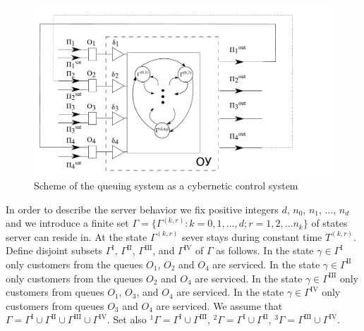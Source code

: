 \documentclass[10pt]{article}
\begin{document}
\begin{figure}[h!]
   \centering
    \includegraphics[width=\textwidth]{SystemScheme.pdf} %
    \caption {Scheme of the queuing system as a cybernetic control system}
    \label{SystemScheme}
\end{figure}

In order to describe the server behavior we fix positive integers $d$, $n_0$, $n_1$, $\ldots$,
$n_d$ and we introduce a finite set $\Gamma=\{\Gamma^{(k,r)} \colon k=0,1,\ldots,d; r=1,2,\ldots
n_k\}$ of states server can reside in. At the state $\Gamma^{(k,r)}$ sever stays during constant
time $T^{(k,r)}$. Define disjoint subsets $\Gamma^{\mathrm{I}}$, $\Gamma^{\mathrm{II}}$,
$\Gamma^{\mathrm{III}}$, and $\Gamma^{\mathrm{IV}}$ of $\Gamma$ as follows.  In the state $\gamma
\in \Gamma^{\mathrm{I}}$ only customers from the queues $O_1$, $O_2$ and $O_4$ are serviced.  In the
state $\gamma \in \Gamma^{\mathrm{II}}$ only customers from the queues $O_2$ and $O_4$ are serviced.
In the state $\gamma \in \Gamma^{\mathrm{III}}$ only customers from queues $O_1$, $O_3$, and $O_4$
are serviced.  In the state $\gamma \in \Gamma^{\mathrm{IV}}$ only customers from queues $O_3$ and
$O_4$ are serviced.  We assume that $\Gamma = \Gamma^{\mathrm{I}} \cup \Gamma^{\mathrm{II}} \cup
\Gamma^{\mathrm{III}} \cup \Gamma^{\mathrm{IV}}$. Set also ${}^1\Gamma=\Gamma^{\mathrm{I}} \cup
\Gamma^{\mathrm{III}}$, ${}^2\Gamma=\Gamma^{\mathrm{I}} \cup \Gamma^{\mathrm{II}}$,
${}^3\Gamma=\Gamma^{\mathrm{III}} \cup \Gamma^{\mathrm{IV}}$.
\end{document}
